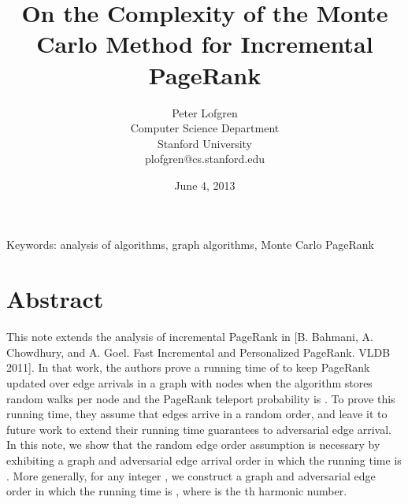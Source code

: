 \documentclass{article}
\begin{document}
\title{On the Complexity of the Monte Carlo Method for Incremental PageRank}
\author{Peter Lofgren\\
  Computer Science Department \\
  Stanford University\\
  plofgren@cs.stanford.edu}


\date{June 4, 2013}
\maketitle

Keywords: analysis of algorithms, graph algorithms, Monte Carlo PageRank

\section{Abstract}
This note extends the analysis of incremental PageRank in [B. Bahmani, A. Chowdhury, and A. Goel. Fast Incremental and Personalized PageRank.  VLDB 2011].  In that work, the authors prove a running time of  to keep PageRank updated over  edge arrivals in a graph with  nodes when the algorithm stores  random walks per node and the PageRank teleport probability is .  To prove this running time, they assume that edges arrive in a random order, and leave it to future work to extend their running time guarantees to adversarial edge arrival.  In this note, we show that the random edge order assumption is necessary by exhibiting a graph and adversarial edge arrival order in which the running time is .  More generally, for any integer , we construct a graph and adversarial edge order in which the running time is , where  is the th harmonic number.
\end{document}
